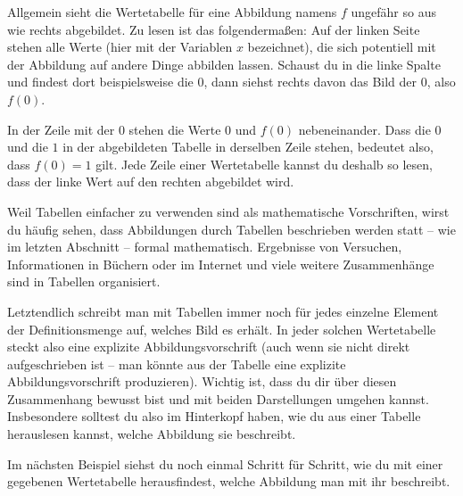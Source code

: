 \documentclass[../../main.tex]{subfiles}
\begin{document}
Allgemein sieht die Wertetabelle für eine Abbildung namens $f$ ungefähr so aus wie rechts abgebildet. Zu lesen ist das folgendermaßen: Auf der linken Seite stehen alle Werte (hier mit der Variablen $x$ bezeichnet), die sich potentiell mit der Abbildung auf andere Dinge abbilden lassen. Schaust du in die linke Spalte und findest dort beispielsweise die $0$, dann siehst rechts davon das Bild der $0$, also $f(0)$. 

In der Zeile mit der $0$ stehen die Werte $0$ und $f(0)$ nebeneinander. Dass die $0$ und die $1$ in der abgebildeten Tabelle in derselben Zeile stehen, bedeutet also, dass $f(0)=1$ gilt. Jede Zeile einer Wertetabelle kannst du deshalb so lesen, dass der linke Wert auf den rechten abgebildet wird.

Weil Tabellen einfacher zu verwenden sind als mathematische Vorschriften, wirst du häufig sehen, dass Abbildungen durch Tabellen beschrieben werden statt -- wie im letzten Abschnitt -- formal mathematisch. Ergebnisse von Versuchen, Informationen in Büchern oder im Internet und viele weitere Zusammenhänge sind in Tabellen organisiert.

Letztendlich schreibt man mit Tabellen immer noch für jedes einzelne Element der Definitionsmenge auf, welches Bild es erhält. In jeder solchen Wertetabelle steckt also eine explizite Abbildungsvorschrift (auch wenn sie nicht direkt aufgeschrieben ist -- man könnte aus der Tabelle eine explizite Abbildungsvorschrift produzieren). Wichtig ist, dass du dir über diesen Zusammenhang bewusst bist und mit beiden Darstellungen umgehen kannst. Insbesondere solltest du also im Hinterkopf haben, wie du aus einer Tabelle herauslesen kannst, welche Abbildung sie beschreibt.

Im nächsten Beispiel siehst du noch einmal Schritt für Schritt, wie du mit einer gegebenen Wertetabelle herausfindest, welche Abbildung man mit ihr beschreibt.
\end{document}
